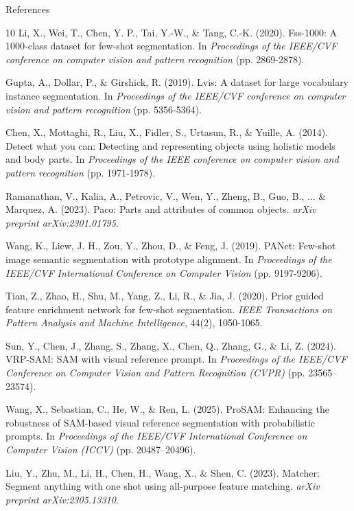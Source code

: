 \documentclass[aspectratio=169, 10pt]{beamer}
\begin{document}
\begin{frame}[allowframebreaks]{References}
\begin{thebibliography}{10}
    Li, X., Wei, T., Chen, Y. P., Tai, Y.-W., \& Tang, C.-K. (2020). Fss-1000: A 1000-class dataset for few-shot segmentation. In \textit{Proceedings of the IEEE/CVF conference on computer vision and pattern recognition} (pp. 2869-2878).

    Gupta, A., Dollar, P., \& Girshick, R. (2019). Lvis: A dataset for large vocabulary instance segmentation. In \textit{Proceedings of the IEEE/CVF conference on computer vision and pattern recognition} (pp. 5356-5364).

    Chen, X., Mottaghi, R., Liu, X., Fidler, S., Urtasun, R., \& Yuille, A. (2014). Detect what you can: Detecting and representing objects using holistic models and body parts. In \textit{Proceedings of the IEEE conference on computer vision and pattern recognition} (pp. 1971-1978).

    Ramanathan, V., Kalia, A., Petrovic, V., Wen, Y., Zheng, B., Guo, B., ... \& Marquez, A. (2023). Paco: Parts and attributes of common objects. \textit{arXiv preprint arXiv:2301.01795}.

    Wang, K., Liew, J. H., Zou, Y., Zhou, D., \& Feng, J. (2019). PANet: Few-shot image semantic segmentation with prototype alignment. In \textit{Proceedings of the IEEE/CVF International Conference on Computer Vision} (pp. 9197-9206).

    Tian, Z., Zhao, H., Shu, M., Yang, Z., Li, R., \& Jia, J. (2020). Prior guided feature enrichment network for few-shot segmentation. \textit{IEEE Transactions on Pattern Analysis and Machine Intelligence}, 44(2), 1050-1065.

Sun, Y., Chen, J., Zhang, S., Zhang, X., Chen, Q., Zhang, G., \& Li, Z. (2024).
VRP-SAM: SAM with visual reference prompt.
In \textit{Proceedings of the IEEE/CVF Conference on Computer Vision and Pattern Recognition (CVPR)} (pp. 23565--23574).

Wang, X., Sebastian, C., He, W., \& Ren, L. (2025).
ProSAM: Enhancing the robustness of SAM-based visual reference segmentation with probabilistic prompts.
In \textit{Proceedings of the IEEE/CVF International Conference on Computer Vision (ICCV)} (pp. 20487--20496).

Liu, Y., Zhu, M., Li, H., Chen, H., Wang, X., \& Shen, C. (2023).
Matcher: Segment anything with one shot using all-purpose feature matching.
\textit{arXiv preprint arXiv:2305.13310}.


\end{thebibliography}
\end{frame}
\end{document}

